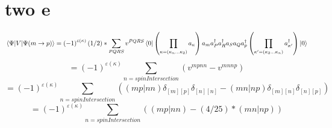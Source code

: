 \documentclass{article}
\begin{document}
\section{two e}
\begin{equation}
    \mel{\Psi }{V}{\Psi (m\rightarrow p)}=\left(-1\right)^{\varepsilon\left(\kappa\right)}(1/2)*\sum_{PQRS} v^{PQRS }\\
    \bra{0}\left(\prod_{\kappa=\left(\kappa_{n}\dots\kappa_{2}\right)}a_{\kappa}\right)
        a_{m}a^{\dag}_{P }a^{\dag}_{R }a_{S }a_{Q }a^{\dag}_{p}
    \left(\prod_{\kappa^{\prime}=\left(\kappa_{2}\dots\kappa_{n}\right)}a^{\dag}_{\kappa^{\prime}}\right)\ket{0}
\end{equation}
\begin{equation}
    =\left(-1\right)^{\varepsilon\left(\kappa\right)}\sum_{n=spinIntersection}\left(v^{mpnn}-v^{mnnp}\right) 
\end{equation}
\begin{equation}
    =\left(-1\right)^{\varepsilon\left(\kappa\right)}\sum_{n=spinIntersection}\left((mp|nn)\delta _{[m][p]}\delta _{[n][n]}-(mn|np)\delta _{[m][n]}\delta _{[n][p]}\right)
\end{equation}
\begin{equation}
    =\left(-1\right)^{\varepsilon\left(\kappa\right)}\sum_{n=spinIntersection}\left((mp|nn)-(4/25)*(mn|np)\right)
\end{equation}
\end{document}
